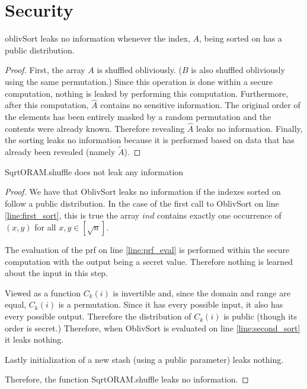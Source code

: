 
\section{Security}

\begin{lemma}
oblivSort leaks no information whenever the index, $A$, being sorted on
has a public distribution.
\end{lemma}

\begin{proof}
First, the array $A$ is shuffled obliviously.
($B$ is also shuffled obliviously using the same permutation.)
Since this operation is done within a secure computation,
nothing is leaked by performing this computation.
Furthermore, after this computation, $\hat{A}$ contains
no sensitive information.
The original order of the elements has been entirely masked by a
random permutation and the contents were already known.
Therefore revealing $\hat{A}$ leaks no information.
Finally, the sorting leaks no information because it is performed
based on data that has already been revealed (namely $\tilde{A}$).
\end{proof}

\begin{theorem}
SqrtORAM.shuffle does not leak any information
\end{theorem}

\begin{proof}
We have that OblivSort leaks no information if the indexes sorted on
follow a public distribution. In the case of the first call
to OblivSort on line \ref{line:first_sort}, this is true
the array $ind$ contains exactly one occurrence of $(x, y)$ 
for all $x, y \in [\sqrt{n}]$.

The evaluation of the prf on line \ref{line:prf_eval} is performed
within the secure computation with the output being a secret value.
Therefore nothing is learned about the input in this step.

Viewed as a function $C_k(i)$ is invertible and, since the domain and range
are equal, $C_k(i)$ is a permutation. 
Since it has every possible input, it also has every possible output.
Therefore the distribution of $C_k(i)$ is public (though its order is secret.)
Therefore, when OblivSort is evaluated on line \ref{line:second_sort} 
it leaks nothing.

Lastly initialization of a new stash (using a public parameter) leaks nothing.

Therefore, the function SqrtORAM.shuffle leaks no information.
\end{proof}
